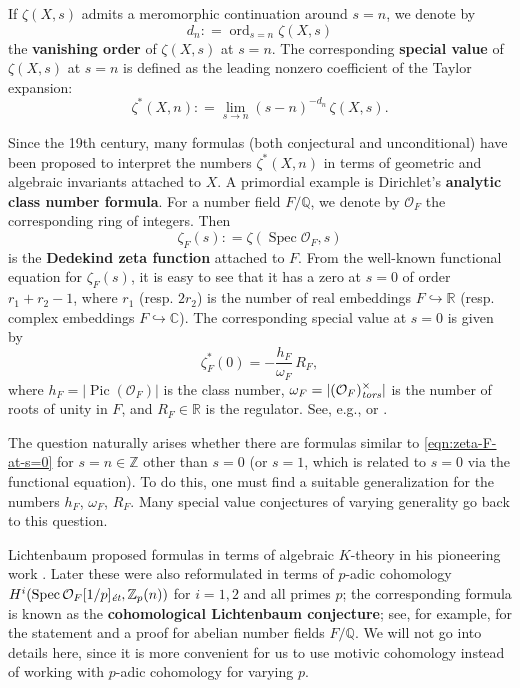 \documentclass{article}
\DeclareMathOperator{\ord}{ord}
\DeclareMathOperator{\Pic}{Pic}
\DeclareMathOperator{\Spec}{Spec}
\newcommand{\CC}{\mathbb{C}}
\newcommand{\QQ}{\mathbb{Q}}
\newcommand{\RR}{\mathbb{R}}
\newcommand{\ZZ}{\mathbb{Z}}
\newcommand{\et}{\text{\it \'{e}t}}
\newcommand{\tors}{\text{\it tors}}
\newcommand{\dfn}{\mathrel{\mathop:}=}
\theoremstyle{myplain}
\theoremstyle{mydefinition}
\begin{document}
If $\zeta (X,s)$ admits a meromorphic continuation around $s = n$, we denote by
\begin{equation}
  \label{eqn:vanishing-order}
  d_n \dfn \ord_{s=n} \zeta (X,s)
\end{equation}
the \textbf{vanishing order} of $\zeta (X,s)$ at $s = n$. The corresponding
\textbf{special value} of $\zeta (X,s)$ at $s = n$ is defined as the leading
nonzero coefficient of the Taylor expansion:
$$\zeta^* (X,n) \dfn \lim_{s \to n} (s - n)^{-d_n}\,\zeta (X,s).$$

Since the 19th century, many formulas (both conjectural and unconditional) have
been proposed to interpret the numbers $\zeta^* (X,n)$ in terms of geometric and
algebraic invariants attached to $X$. A primordial example is Dirichlet's
\textbf{analytic class number formula}. For a number field $F/\QQ$, we denote by
$\mathcal{O}_F$ the corresponding ring of integers. Then
$$\zeta_F (s) \dfn \zeta (\Spec \mathcal{O}_F, s)$$
is the \textbf{Dedekind zeta function} attached to $F$. From the well-known
functional equation for $\zeta_F (s)$, it is easy to see that it has a zero at
$s = 0$ of order $r_1 + r_2 - 1$, where $r_1$ (resp.  $2 r_2$) is the number of
real embeddings $F \hookrightarrow \RR$ (resp. complex embeddings
$F \hookrightarrow \CC$). The corresponding special value at $s = 0$ is given by
\begin{equation}
  \label{eqn:zeta-F-at-s=0}
  \zeta^*_F (0) = -\frac{h_F}{\omega_F}\,R_F,
\end{equation}
where $h_F = |\Pic (\mathcal{O}_F)|$ is the class number,
$\omega_F = |(\mathcal{O}_F)^\times_\tors|$ is the number of roots of unity in
$F$, and $R_F \in \RR$ is the regulator. See, e.g.,
\cite[Chapter~5, \S 1]{Borevich-Shafarevich} or \cite[\S VII.5]{Neukirch-1999}.

The question naturally arises whether there are formulas similar to
\eqref{eqn:zeta-F-at-s=0} for $s = n \in \ZZ$ other than $s = 0$ (or $s = 1$,
which is related to $s = 0$ via the functional equation). To do this, one must
find a suitable generalization for the numbers $h_F$, $\omega_F$, $R_F$.  Many
special value conjectures of varying generality go back to this question.

Lichtenbaum proposed formulas in terms of algebraic $K$-theory in his pioneering
work \cite{Lichtenbaum-1973}. Later these were also reformulated in terms of
$p$-adic cohomology $H^i (\Spec \mathcal{O}_F [1/p]_\et, \ZZ_p (n))$ for
$i = 1,2$ and all primes $p$; the corresponding formula is known as the
\textbf{cohomological Lichtenbaum conjecture}; see, for example,
\cite[\S 1.7]{Huber-Kings-2003} for the statement and a proof for abelian number
fields $F/\QQ$. We will not go into details here, since it is more convenient
for us to use motivic cohomology instead of working with $p$-adic cohomology for
varying $p$.
\end{document}
